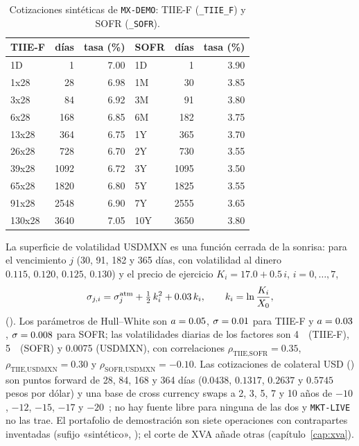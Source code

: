 \begin{sloppypar}
\begin{table}[ht]
  \centering\small
  \caption{Cotizaciones sintéticas de \texttt{MX-DEMO}: TIIE-F (\texttt{\_TIIE\_F}) y SOFR (\texttt{\_SOFR}).}\label{tab:cap13-cotizaciones}
  \begin{tabular}{@{}lrrlrr@{}}
    \toprule
    TIIE-F & días & tasa (\%) & SOFR & días & tasa (\%) \\
    \midrule
    1D & 1 & 7.00 & 1D & 1 & 3.90 \\
    1x28 & 28 & 6.98 & 1M & 30 & 3.85 \\
    3x28 & 84 & 6.92 & 3M & 91 & 3.80 \\
    6x28 & 168 & 6.85 & 6M & 182 & 3.75 \\
    13x28 & 364 & 6.75 & 1Y & 365 & 3.70 \\
    26x28 & 728 & 6.70 & 2Y & 730 & 3.55 \\
    39x28 & 1092 & 6.72 & 3Y & 1095 & 3.50 \\
    65x28 & 1820 & 6.80 & 5Y & 1825 & 3.55 \\
    91x28 & 2548 & 6.90 & 7Y & 2555 & 3.65 \\
    130x28 & 3640 & 7.05 & 10Y & 3650 & 3.80 \\
    \bottomrule
  \end{tabular}
\end{table}

La superficie de volatilidad USDMXN es una función cerrada de la sonrisa: para el vencimiento $j$
(30, 91, 182 y 365 días, con volatilidad al dinero $0.115,\,0.120,\,0.125,\,0.130$) y el precio de ejercicio
$K_i=17.0+0.5\,i$, $i=0,\dots,7$,
\begin{equation}\label{eq:cap13-sonrisa}
  \sigma_{j,i}=\sigma^{\mathrm{atm}}_{j}+\tfrac12\,k_i^{2}+0.03\,k_i,\qquad k_i=\ln\frac{K_i}{X_0},
\end{equation}
(). Los parámetros de Hull--White son $a=0.05$, $\sigma=0.01$ para
TIIE-F y $a=0.03$, $\sigma=0.008$ para SOFR; las volatilidades diarias de los factores son 4~\pb\ (TIIE-F),
5~\pb\ (SOFR) y 0.0075 (USDMXN), con correlaciones $\rho_{\text{TIIE,SOFR}}=0.35$,
$\rho_{\text{TIIE,USDMXN}}=0.30$ y $\rho_{\text{SOFR,USDMXN}}=-0.10$. Las cotizaciones de colateral USD
() son puntos forward de 28, 84, 168 y 364 días
($0.0438$, $0.1317$, $0.2637$ y $0.5745$ pesos por dólar) y una base de cross currency swaps a 2, 3, 5, 7 y
10 años de $-10$, $-12$, $-15$, $-17$ y $-20$~\pb; no hay fuente libre para ninguna de las dos y \texttt{MKT-LIVE}
no las trae. El portafolio de demostración son siete operaciones con contrapartes inventadas (sufijo
«sintético», ); el corte de XVA añade otras
(capítulo~\ref{cap:xva}).


\end{sloppypar}
